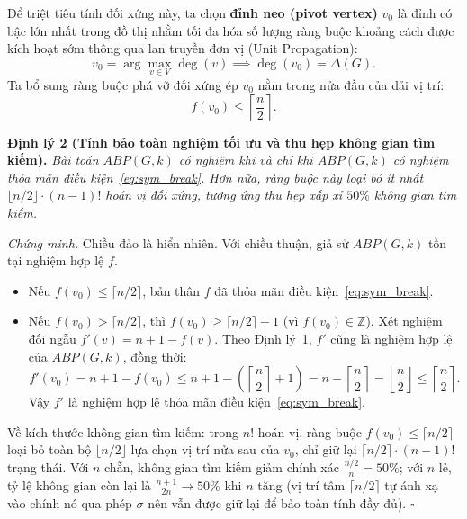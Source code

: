 \documentclass[a4paper,fleqn]{cas-sc}
\begin{document}
Để triệt tiêu tính đối xứng này, ta chọn \textbf{đỉnh neo (pivot vertex)} $v_0$ là đỉnh có bậc lớn nhất trong đồ thị nhằm tối đa hóa số lượng ràng buộc khoảng cách được kích hoạt sớm thông qua lan truyền đơn vị (Unit Propagation):
\begin{equation}
    v_0 = \arg\max_{v \in V} \deg(v) \implies \deg(v_0) = \Delta(G).
\end{equation}
Ta bổ sung ràng buộc phá vỡ đối xứng ép $v_0$ nằm trong nửa đầu của dải vị trí:
\begin{equation}
    f(v_0) \le \left\lceil \frac{n}{2} \right\rceil.
    \label{eq:sym_break}
\end{equation}

\noindent\textbf{Định lý 2 (Tính bảo toàn nghiệm tối ưu và thu hẹp không gian tìm kiếm).}
\textit{Bài toán $ABP(G, k)$ có nghiệm khi và chỉ khi $ABP(G, k)$ có nghiệm thỏa mãn điều kiện~\eqref{eq:sym_break}. Hơn nữa, ràng buộc này loại bỏ ít nhất $\lfloor n/2 \rfloor \cdot (n - 1)!$ hoán vị đối xứng, tương ứng thu hẹp xấp xỉ $50\%$ không gian tìm kiếm.}

\noindent\textit{Chứng minh.}
Chiều đảo là hiển nhiên. Với chiều thuận, giả sử $ABP(G, k)$ tồn tại nghiệm hợp lệ $f$.
\begin{itemize}
    \item Nếu $f(v_0) \le \lceil n/2 \rceil$, bản thân $f$ đã thỏa mãn điều kiện~\eqref{eq:sym_break}.
    \item Nếu $f(v_0) > \lceil n/2 \rceil$, thì $f(v_0) \ge \lceil n/2 \rceil + 1$ (vì $f(v_0) \in \mathbb{Z}$). Xét nghiệm đối ngẫu $f'(v) = n + 1 - f(v)$. Theo Định lý~1, $f'$ cũng là nghiệm hợp lệ của $ABP(G, k)$, đồng thời:
    \begin{equation}
        f'(v_0) = n + 1 - f(v_0) \le n + 1 - \left(\left\lceil \frac{n}{2} \right\rceil + 1\right) = n - \left\lceil \frac{n}{2} \right\rceil = \left\lfloor \frac{n}{2} \right\rfloor \le \left\lceil \frac{n}{2} \right\rceil.
    \end{equation}
    Vậy $f'$ là nghiệm hợp lệ thỏa mãn điều kiện~\eqref{eq:sym_break}.
\end{itemize}
Về kích thước không gian tìm kiếm: trong $n!$ hoán vị, ràng buộc $f(v_0) \le \lceil n/2 \rceil$ loại bỏ toàn bộ $\lfloor n/2 \rfloor$ lựa chọn vị trí nửa sau của $v_0$, chỉ giữ lại $\lceil n/2 \rceil \cdot (n - 1)!$ trạng thái. Với $n$ chẵn, không gian tìm kiếm giảm chính xác $\frac{n/2}{n} = 50\%$; với $n$ lẻ, tỷ lệ không gian còn lại là $\frac{n+1}{2n} \to 50\%$ khi $n$ tăng (vị trí tâm $\lceil n/2 \rceil$ tự ánh xạ vào chính nó qua phép $\sigma$ nên vẫn được giữ lại để bảo toàn tính đầy đủ). \hfill $\square$
\end{document}
